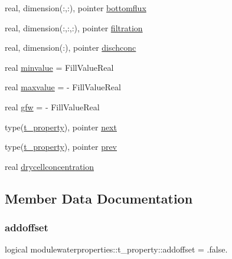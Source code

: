\begin{DoxyCompactItemize}
\item 
real, dimension(\+:,\+:), pointer \mbox{\hyperlink{structmodulewaterproperties_1_1t__property_ad21f846189c78d8acba2a1095e49ab76}{bottomflux}}
\item 
real, dimension(\+:,\+:,\+:), pointer \mbox{\hyperlink{structmodulewaterproperties_1_1t__property_a05041617df3efc61581733376d0d3ec2}{filtration}}
\item 
real, dimension(\+:), pointer \mbox{\hyperlink{structmodulewaterproperties_1_1t__property_a45ada3572c819d5e458910329d2c8a22}{dischconc}}
\item 
real \mbox{\hyperlink{structmodulewaterproperties_1_1t__property_ae84cee9690b7b4d7854ca76235982ecd}{minvalue}} = Fill\+Value\+Real
\item 
real \mbox{\hyperlink{structmodulewaterproperties_1_1t__property_a6d35ddd86710a4a1170e5da8189d1dde}{maxvalue}} = -\/ Fill\+Value\+Real
\item 
real \mbox{\hyperlink{structmodulewaterproperties_1_1t__property_ac9e25132712511eda39a7f4ee3bb7cb6}{gfw}} = -\/ Fill\+Value\+Real
\item 
type(\mbox{\hyperlink{structmodulewaterproperties_1_1t__property}{t\+\_\+property}}), pointer \mbox{\hyperlink{structmodulewaterproperties_1_1t__property_a33aa593cde2b841050a310641c294014}{next}}
\item 
type(\mbox{\hyperlink{structmodulewaterproperties_1_1t__property}{t\+\_\+property}}), pointer \mbox{\hyperlink{structmodulewaterproperties_1_1t__property_af8a67f6cd3467ad052548da87650f91e}{prev}}
\item 
real \mbox{\hyperlink{structmodulewaterproperties_1_1t__property_a80a1107a0873f89b797bfa848edcd299}{drycellconcentration}}
\end{DoxyCompactItemize}


\subsection{Member Data Documentation}
\mbox{\label{structmodulewaterproperties_1_1t__property_a0315fc1293e4614ebe9e92c079dac692}} 
\subsubsection{\texorpdfstring{addoffset}{addoffset}}
{\footnotesize\ttfamily logical modulewaterproperties\+::t\+\_\+property\+::addoffset = .false.\hspace{0.3cm}{\ttfamily [private]}}

